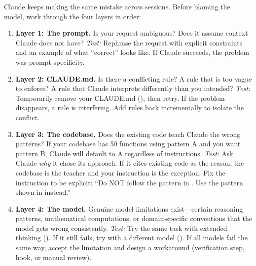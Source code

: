 
Claude keeps making the same mistake across sessions.
Before blaming the model, work through the four layers in order:

\begin{enumerate}
  \item \textbf{Layer 1: The prompt.}
    Is your request ambiguous? Does it assume context Claude does not have?
    \emph{Test:} Rephrase the request with explicit constraints and
    an example of what ``correct'' looks like. If Claude succeeds,
    the problem was prompt specificity.

  \item \textbf{Layer 2: CLAUDE.md.}
    Is there a conflicting rule? A rule that is too vague to enforce?
    A rule that Claude interprets differently than you intended?
    \emph{Test:} Temporarily remove your CLAUDE.md (), then retry. If the problem disappears,
    a rule is interfering. Add rules back incrementally to isolate
    the conflict.

  \item \textbf{Layer 3: The codebase.}
    Does the existing code teach Claude the wrong patterns?
    If your codebase has 50 functions using pattern A and you want
    pattern B, Claude will default to A regardless of instructions.
    \emph{Test:} Ask Claude \emph{why} it chose its approach.
    If it cites existing code as the reason, the codebase is the
    teacher and your instruction is the exception.
    Fix the instruction to be explicit: ``Do NOT follow the pattern
    in . Use the pattern shown in  instead.''

  \item \textbf{Layer 4: The model.}
    Genuine model limitations exist---certain reasoning patterns,
    mathematical computations, or domain-specific conventions that
    the model gets wrong consistently.
    \emph{Test:} Try the same task with extended thinking ().
    If it still fails, try with a different model ().
    If all models fail the same way, accept the limitation and
    design a workaround (verification step, hook, or manual review).
\end{enumerate}


